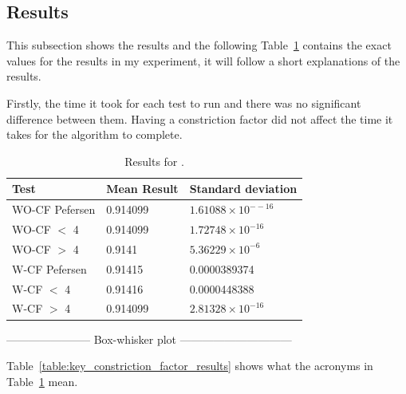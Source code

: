 \documentclass{pdfmx4020}
\begin{document}
    \subsection{Results} %
    \label{sub:results}
      This subsection shows the results and the following Table~\ref{table:constriction_factor_results} contains the exact values for the results in my experiment, it will follow a short explanations of the results. 

      Firstly, the time it took for each test to run and there was no significant difference between them. Having a constriction factor did not affect the time it takes for the algorithm to complete. 

        \begin{table}[H]
          \setlength{\extrarowheight}{2.0pt}
          \begin{tabular}{|l|l|l|}
            \hline
            Test & Mean Result & Standard deviation \\
            \hline
            WO-CF Pefersen & 0.914099 & $1.61088\times10^{--16}$ \\
            \hline
            WO-CF $<$ 4 & 0.914099 & $1.72748\times10^{-16}$ \\
            \hline
            WO-CF $>$ 4 & 0.9141 & $5.36229\times10^{-6}$ \\
            \hline
            W-CF Pefersen & 0.91415 & 0.0000389374 \\
            \hline
            W-CF $<$ 4 & 0.91416 & 0.0000448388 \\
            \hline
            W-CF $>$ 4 & 0.914099 & $2.81328\times10^{-16}$ \\
            \hline
          \end{tabular}
          \caption{Results for .}
          \label{table:constriction_factor_results}
        \end{table}

      ----------------------- Box-whisker plot ------------------------------

      Table~\ref{table:key_constriction_factor_results} shows what the acronyms in Table~\ref{table:constriction_factor_results} mean. 
\end{document}
